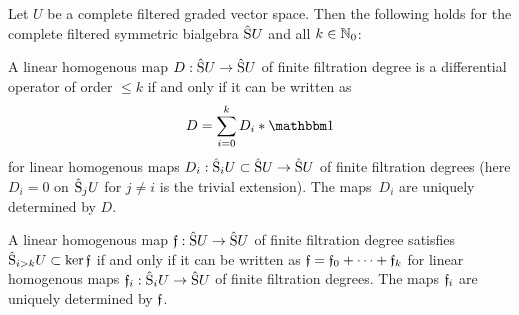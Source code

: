 \documentclass[\MainFolder/Text.tex]{subfiles}
\begin{document}
\begin{Lemma}\label{Lem:ComplSymBialg}
Let $U$ be a complete filtered graded vector space. Then the following holds for the complete filtered symmetric bialgebra $\hat{\mathrm{S}} U$ and all $k\in \mathbb{N}_0$:
\begin{ClaimList}
 \item A linear homogenous map $D: \hat{\mathrm{S}}U \rightarrow \hat{\mathrm{S}}U$ of finite filtration degree is a differential operator of order $\le k$ if and only if it can be written as 
\begin{equation}\label{Eq:DifOpForm}
D = \sum_{i=0}^k D_i \Star \Id
\end{equation}
for linear homogenous maps $D_i : \hat{\mathrm{S}}_i U\subset\hat{\mathrm{S}}U \rightarrow \hat{\mathrm{S}} U$ of finite filtration degrees (here $D_i = 0$ on $\hat{\mathrm{S}}_j U$ for $j\neq i$ is the trivial extension). The maps~$D_i$ are uniquely determined by $D$.
 \item A linear homogenous map $\mathfrak{f}:\hat{\mathrm{S}}U\rightarrow\hat{\mathrm{S}}U$ of finite filtration degree satisfies $\hat{\mathrm{S}}_{i>k}U\subset\ker\mathfrak{f}$ if and only if it can be written as $\mathfrak{f} = \mathfrak{f}_0 + \dotsb + \mathfrak{f}_k$ for linear homogenous maps $\mathfrak{f}_i: \hat{\mathrm{S}}_iU\rightarrow\hat{\mathrm{S}}U$ of finite filtration degrees. The maps $\mathfrak{f}_i$ are uniquely determined by $\mathfrak{f}$.
\end{ClaimList}
\end{Lemma}
\end{document}
